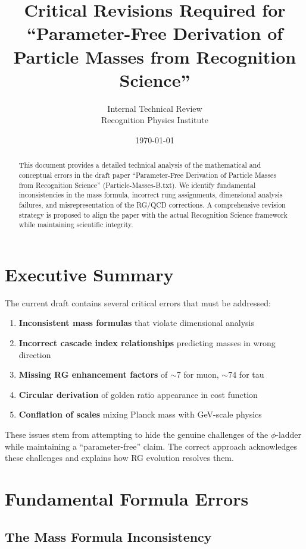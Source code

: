 \documentclass[12pt,a4paper]{article}
\title{Critical Revisions Required for\\
``Parameter-Free Derivation of Particle Masses from Recognition Science''}
\author{Internal Technical Review\\Recognition Physics Institute}
\date{\today}
\begin{document}
\maketitle

\begin{abstract}
This document provides a detailed technical analysis of the mathematical and conceptual errors in the draft paper ``Parameter-Free Derivation of Particle Masses from Recognition Science'' (Particle-Masses-B.txt). We identify fundamental inconsistencies in the mass formula, incorrect rung assignments, dimensional analysis failures, and misrepresentation of the RG/QCD corrections. A comprehensive revision strategy is proposed to align the paper with the actual Recognition Science framework while maintaining scientific integrity.
\end{abstract}

\tableofcontents
\newpage

\section{Executive Summary}

The current draft contains several critical errors that must be addressed:

\begin{enumerate}
\item \textbf{Inconsistent mass formulas} that violate dimensional analysis
\item \textbf{Incorrect cascade index relationships} predicting masses in wrong direction  
\item \textbf{Missing RG enhancement factors} of $\sim$7 for muon, $\sim$74 for tau
\item \textbf{Circular derivation} of golden ratio appearance in cost function
\item \textbf{Conflation of scales} mixing Planck mass with GeV-scale physics
\end{enumerate}

These issues stem from attempting to hide the genuine challenges of the $\phi$-ladder while maintaining a ``parameter-free'' claim. The correct approach acknowledges these challenges and explains how RG evolution resolves them.

\section{Fundamental Formula Errors}

\subsection{The Mass Formula Inconsistency}
\end{document}
